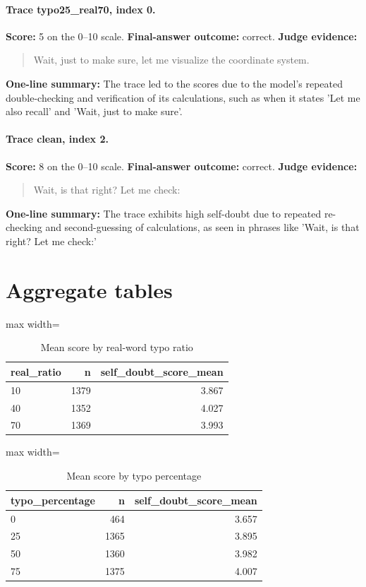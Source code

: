 \documentclass[11pt]{article}
\begin{document}
\paragraph{Trace typo25\_real70, index 0.}
\textbf{Score:} 5 on the 0--10 scale. \textbf{Final-answer outcome:} correct.
\textbf{Judge evidence:} \begin{quote}Wait, just to make sure, let me visualize the coordinate system.\end{quote}
\textbf{One-line summary:} The trace led to the scores due to the model's repeated double-checking and verification of its calculations, such as when it states 'Let me also recall' and 'Wait, just to make sure'.\medskip
\paragraph{Trace clean, index 2.}
\textbf{Score:} 8 on the 0--10 scale. \textbf{Final-answer outcome:} correct.
\textbf{Judge evidence:} \begin{quote}Wait, is that right? Let me check:\end{quote}
\textbf{One-line summary:} The trace exhibits high self-doubt due to repeated re-checking and second-guessing of calculations, as seen in phrases like 'Wait, is that right? Let me check:'\medskip

\section*{Aggregate tables}

\begin{table}[H]
\centering
\caption{Mean score by real-word typo ratio}
\small
\begin{adjustbox}{max width=\textwidth}
\begin{tabular}{lrr}
\toprule
\textbf{real\_ratio} & \textbf{n} & \textbf{self\_doubt\_score\_mean} \\
\midrule
10 & 1379 & 3.867 \\
40 & 1352 & 4.027 \\
70 & 1369 & 3.993 \\
\bottomrule
\end{tabular}
\end{adjustbox}
\end{table}

\begin{table}[H]
\centering
\caption{Mean score by typo percentage}
\small
\begin{adjustbox}{max width=\textwidth}
\begin{tabular}{lrr}
\toprule
\textbf{typo\_percentage} & \textbf{n} & \textbf{self\_doubt\_score\_mean} \\
\midrule
0 & 464 & 3.657 \\
25 & 1365 & 3.895 \\
50 & 1360 & 3.982 \\
75 & 1375 & 4.007 \\
\bottomrule
\end{tabular}
\end{adjustbox}
\end{table}
\end{document}
